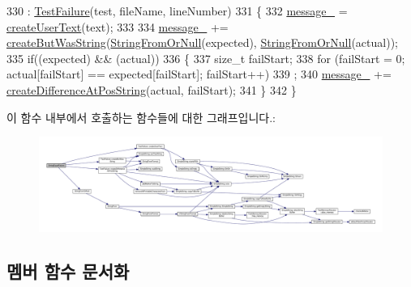 \begin{DoxyCode}
330 : \hyperlink{class_test_failure_ac777aac1978181d7dfbb6be572da7341}{TestFailure}(test, fileName, lineNumber)
331 \{
332     \hyperlink{class_test_failure_af95aeab689fdb637c3e94b0c10db3e53}{message\_} = \hyperlink{class_test_failure_ae67765ada519d8a163922f50099a0016}{createUserText}(text);
333 
334     \hyperlink{class_test_failure_af95aeab689fdb637c3e94b0c10db3e53}{message\_} += \hyperlink{class_test_failure_a14e11a7282409ba8fb985ab58c983856}{createButWasString}(\hyperlink{_simple_string_8h_a58768509e9cf64eef99ec908fe7d8f67}{StringFromOrNull}(expected), 
      \hyperlink{_simple_string_8h_a58768509e9cf64eef99ec908fe7d8f67}{StringFromOrNull}(actual));
335     \textcolor{keywordflow}{if}((expected) && (actual))
336     \{
337         \textcolor{keywordtype}{size\_t} failStart;
338         \textcolor{keywordflow}{for} (failStart = 0; actual[failStart] == expected[failStart]; failStart++)
339             ;
340         \hyperlink{class_test_failure_af95aeab689fdb637c3e94b0c10db3e53}{message\_} += \hyperlink{class_test_failure_a61d48c22fc7e93fe35b7d2c596c3a39e}{createDifferenceAtPosString}(actual, failStart);
341     \}
342 \}
\end{DoxyCode}


이 함수 내부에서 호출하는 함수들에 대한 그래프입니다.\+:
\nopagebreak
\begin{figure}[H]
\begin{center}
\leavevmode
\includegraphics[width=350pt]{class_string_equal_failure_a0f71f0a2febd1257a8ee92033dbdfd49_cgraph}
\end{center}
\end{figure}




\subsection{멤버 함수 문서화}

